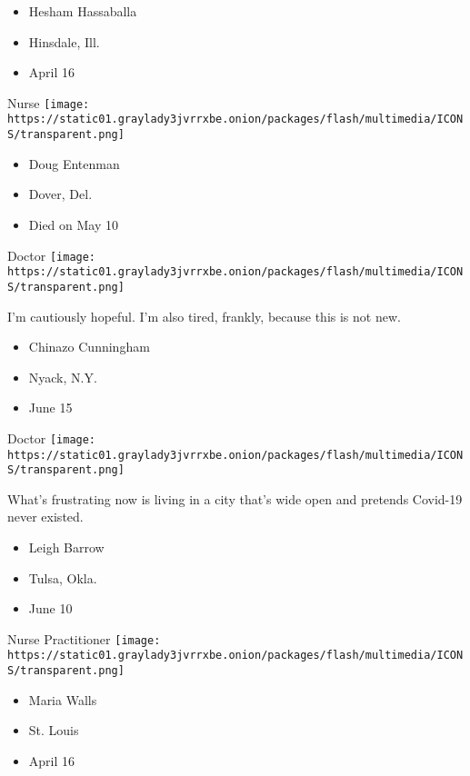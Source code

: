 \begin{itemize}
\tightlist
\item
  Hesham Hassaballa
\item
  Hinsdale, Ill.
\item
  April 16
\end{itemize}

\protect\hyperlink{item-doug-entenman}{}

Nurse
\texttt{[image: https://static01.graylady3jvrrxbe.onion/packages/flash/multimedia/ICONS/transparent.png]}

\begin{itemize}
\tightlist
\item
  Doug Entenman
\item
  Dover, Del.
\item
  Died on May 10
\end{itemize}

\protect\hyperlink{item-chinazo-cunningham}{}

Doctor
\texttt{[image: https://static01.graylady3jvrrxbe.onion/packages/flash/multimedia/ICONS/transparent.png]}

I'm cautiously hopeful. I'm also tired, frankly, because this is not
new.

\begin{itemize}
\tightlist
\item
  Chinazo Cunningham
\item
  Nyack, N.Y.
\item
  June 15
\end{itemize}

\protect\hyperlink{item-leigh-barrow}{}

Doctor
\texttt{[image: https://static01.graylady3jvrrxbe.onion/packages/flash/multimedia/ICONS/transparent.png]}

What's frustrating now is living in a city that's wide open and pretends
Covid-19 never existed.

\begin{itemize}
\tightlist
\item
  Leigh Barrow
\item
  Tulsa, Okla.
\item
  June 10
\end{itemize}

\protect\hyperlink{item-maria-walls}{}

Nurse Practitioner
\texttt{[image: https://static01.graylady3jvrrxbe.onion/packages/flash/multimedia/ICONS/transparent.png]}

\begin{itemize}
\tightlist
\item
  Maria Walls
\item
  St. Louis
\item
  April 16
\end{itemize}

